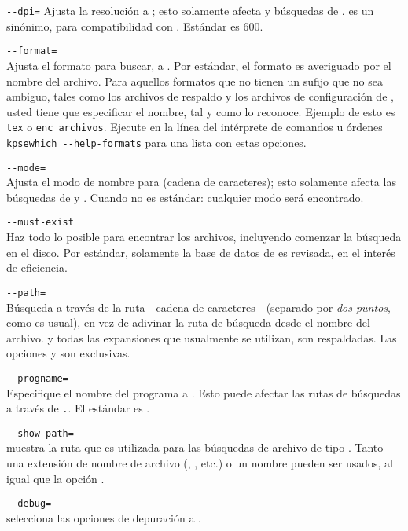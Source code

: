 \documentclass{article}
\begin{document}
\begin{ttdescription}
	\item[\texttt{-{}-dpi=\var{num}}]\mbox{}
	Ajusta la resolución a ; esto solamente afecta
	 y búsquedas de .  es un sinónimo,
	para compatibilidad con . Estándar es 600.  
\item[\texttt{-{}-format=\var{name}}]\mbox{}\\
	Ajusta el formato para buscar, a . Por estándar,
	el formato es averiguado por el nombre del archivo. Para
	aquellos formatos que no tienen un sufijo que no sea ambiguo,
	tales como los archivos de respaldo \MP{} y los archivos de
	configuración de , usted tiene que especificar
	el nombre, tal y como \KPS{} lo reconoce. Ejemplo de esto es
	\texttt{tex} o \texttt{enc archivos}. Ejecute en la línea del intérprete de
	comandos u órdenes \texttt{kpsewhich -{}-help-formats} para una lista con estas opciones. 
\item[\texttt{-{}-mode=\var{string}}]\mbox{}\\
        Ajusta el modo de nombre para  (cadena de
        caracteres); esto solamente afecta las búsquedas de 
        y . Cuando no es estándar: cualquier modo será
        encontrado. 
\item[\texttt{-{}-must-exist}]\mbox{}\\
	Haz todo lo posible para encontrar los archivos, incluyendo
	comenzar la búsqueda en el disco. Por estándar, solamente la
	base de datos de  es revisada, en el interés de
	eficiencia. 
\item[\texttt{-{}-path=\var{string}}]\mbox{}\\
	Búsqueda a través de la ruta  - cadena de caracteres - (separado
	por \emph{dos puntos}, como es usual), en vez de adivinar la ruta
	de búsqueda desde el nombre del archivo. \samp{//} y
	todas las expansiones que usualmente se utilizan, son respaldadas. Las
	opciones  y  son
	exclusivas.
\item[\texttt{-{}-progname=\var{name}}]\mbox{}\\
	Especifique el nombre del programa a \texttt{}.
	Esto puede afectar las rutas de búsquedas a través de
	\texttt{.}. El estándar es .
\item[\texttt{-{}-show-path=\var{name}}]\mbox{}\\
	muestra la ruta que es utilizada para las búsquedas de archivo de tipo
	\texttt{}. 
        Tanto una extensión de nombre de archivo (,
        , etc.) o un nombre pueden ser usados, al igual que
        la opción .
\item[\texttt{-{}-debug=\var{num}}]\mbox{}\\
	selecciona las opciones de depuración a \texttt{}.
\end{ttdescription}
\end{document}
